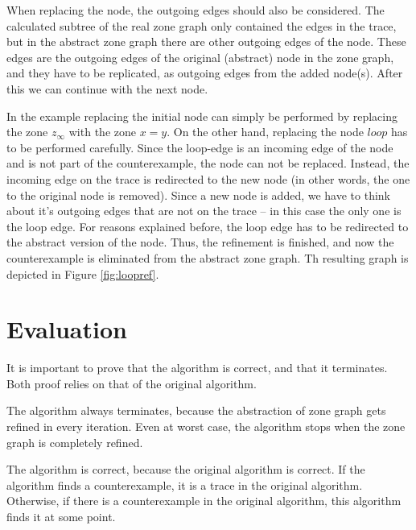 When replacing the node, the outgoing edges should also be considered. The calculated subtree of the real zone graph only contained the edges in the trace, but in the abstract zone graph there are other outgoing edges of the node. These edges are the outgoing edges of the original (abstract) node in the zone graph, and they have to be replicated, as outgoing edges from the added node(s). After this we can continue with the next node.

\begin{example}
In the example replacing the initial node can simply be performed by replacing the zone $z_\infty$ with the zone $x=y$. On the other hand, replacing the node $loop$ has to be performed carefully. Since the loop-edge is an incoming edge of the node and is not part of the counterexample, the node can not be replaced. Instead, the incoming edge on the trace is redirected to the new node (in other words, the one to the original node is removed). Since a new node is added, we have to think about it's outgoing edges that are not on the trace -- in this case the only one is the loop edge. For reasons explained before, the loop edge has to be redirected to the abstract version of the node. Thus, the refinement is finished, and now the counterexample is eliminated from the abstract zone graph. Th resulting graph is depicted in Figure \ref{fig:loopref}.
\end{example}




\section{Evaluation}

It is important to prove that the algorithm is correct, and that it terminates. Both proof relies on that of the original algorithm.

The algorithm always terminates, because the abstraction of zone graph gets refined in every iteration. Even at worst case, the algorithm stops when the zone graph is completely refined.

The algorithm is correct, because the original algorithm is correct. If the algorithm finds a counterexample, it is a trace in the original algorithm. Otherwise, if there is a counterexample in the original algorithm, this algorithm finds it at some point.



